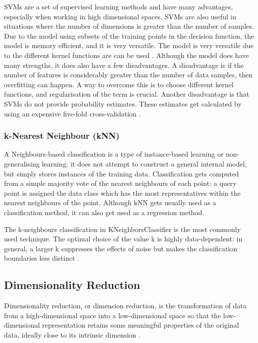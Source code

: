 	SVMs are a set of supervised learning methods and have many advantages, especially when working in high dimensional spaces. SVMs are also useful in situations where the number of dimensions is greater than the number of samples. Due to the model using subsets of the training points in the decision function, the model is memory efficient, and it is very versatile. The model is very versatile due to the different kernel functions are can be used \cite{sklearn_svm}. Although the model does have many strengths, it does also have a few disadvantages. A disadvantage is if the number of features is considerably greater than the number of data samples, then overfitting can happen. A way to overcome this is to choose different kernel functions, and regularisation of the term is crucial. Another disadvantage is that SVMs do not provide probability estimates. These estimates get calculated by using an expensive five-fold cross-validation \cite{sklearn_svm}.

	
	\subsubsection{k-Nearest Neighbour (kNN)}
		\label{seb_sec:kNN}
		
		A Neighbours-based classification is a type of instance-based learning or non-generalising learning: it does not attempt to construct a general internal model, but simply stores instances of the training data. Classification gets computed from a simple majority vote of the nearest neighbours of each point: a query point is assigned the data class which has the most representatives within the nearest neighbours of the point. Although kNN gets usually used as a classification method, it can also get used as a regression method.
		
		The k-neighbours classification in KNeighborsClassifier is the most commonly used technique. The optimal choice of the value k is highly data-dependent: in general, a larger k suppresses the effects of noise but makes the classification boundaries less distinct \cite{sklearn_knn}.
		
	\subsection{Dimensionality Reduction}
		\label{seb_sec:dd}
		
		Dimensionality reduction, or dimension reduction, is the transformation of data from a high-dimensional space into a low-dimensional space so that the low-dimensional representation retains some meaningful properties of the original data, ideally close to its intrinsic dimension \cite{geron2019hands}.
		
